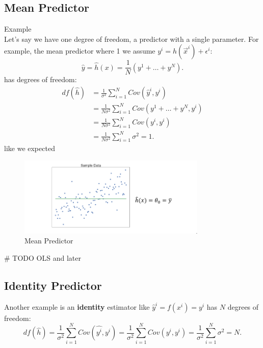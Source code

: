 \documentclass[a4paper]{article}
\begin{document}
\subsection{Mean Predictor}
\begin{note}{Example} \\
  Let's say we have one degree of freedom, a predictor with a single parameter. For example, the mean predictor where
1  we assume $y^i = h(\vec{x}^i) + \epsilon^i$:
  \[
  \hat{y} = \hat{h}(x) = \frac{1}{N} (y^{1} + \ldots + y^{N})
  .\] 
  has degrees of freedom:
  \begin{align*}
    df(\hat{h}) &= \frac{1}{\sigma^2} \sum_{i=1}^N Cov(\hat{y}^i, y^i) \\
                &= \frac{1}{N \sigma^2}  \sum_{i=1}^N Cov(y^{1} + \ldots + y^{N}, y^i) \\
                &= \frac{1}{N \sigma^2}  \sum_{i=1}^N Cov(y^i, y^i) \\ 
                &= \frac{1}{N \sigma^2}  \sum_{i=1}^N \sigma^2 = 1
  .\end{align*}
  like we expected

\begin{figure}[h]
  \centering
  \includegraphics[width=0.8\textwidth]{assets/mean_predictor_df.png}
  \caption{Mean Predictor}
  \label{fig:mean_predictor_df}
\end{figure}
  # TODO OLS and later
\end{note}

\subsection{Identity Predictor}
\begin{note}
  Another example is an \textbf{identity} estimator like $\hat{y}^i = f(x^i) = y^i$ has $N$ degrees of freedom:
   \[
     df(\hat{h}) = \frac{1}{\sigma^2} \sum_{i=1}^N Cov(\hat{y^i}, y^i) = \frac{1}{\sigma^2} \sum_{i=1}^N Cov(y^i, y^i) = \frac{1}{\sigma^2}\sum_{i=1}^N \sigma^2 = N
  .\] 
\end{note}
\end{document}
